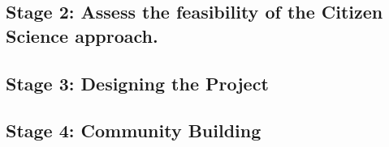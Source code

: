 \subsection{Stage 2: Assess the feasibility of the Citizen Science approach.}







\subsection{Stage 3: Designing the Project}%


\subsection{Stage 4: Community Building}



